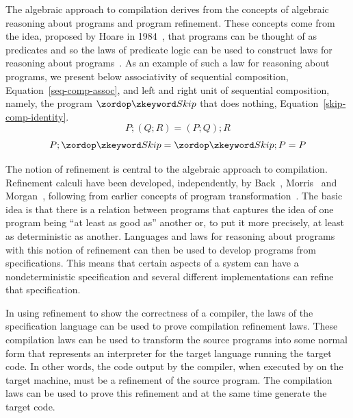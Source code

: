The algebraic approach to compilation derives from the concepts of
algebraic reasoning about programs and program refinement.
These concepts come from the idea, proposed by Hoare in
1984~\cite{hoare1984}, that programs can be thought of as predicates
and so the laws of predicate logic can be used to construct laws for
reasoning about programs~\cite{hoare1987}.
As an example of such a law for reasoning about programs, we present
below associativity of sequential composition,
Equation~\eqref{seq-comp-assoc}, and left and right unit of sequential
composition, namely, the program $\Skip$ that does nothing,
Equation~\eqref{skip-comp-identity}.
\begin{equation}
  \label{seq-comp-assoc}
  P;(Q;R) = (P;Q);R
\end{equation}
\begin{equation}
  \label{skip-comp-identity}
  P;\Skip = \Skip;P = P
\end{equation}

The notion of refinement is central to the algebraic approach to
compilation.
Refinement calculi have been developed, independently, by
Back~\cite{back1981}, Morris~\cite{morris1987} and
Morgan~\cite{morgan1990}, following from earlier concepts of program
transformation~\cite{bauer1976, balzer1976, standish1976, arsac1979}.
The basic idea is that there is a relation between programs that
captures the idea of one program being ``at least as good as'' another
or, to put it more precisely, at least as deterministic as another.
Languages and laws for reasoning about programs with this notion of
refinement can then be used to develop programs from specifications.
This means that certain aspects of a system can have a
nondeterministic specification and several different implementations
can refine that specification.

In using refinement to show the correctness of a compiler, the laws of
the specification language can be used to prove compilation refinement
laws.
These compilation laws can be used to transform the source programs
into some normal form that represents an interpreter for the target
language running the target code.
In other words, the code output by the compiler, when executed by on
the target machine, must be a refinement of the source program.
The compilation laws can be used to prove this refinement and at the
same time generate the target code.

